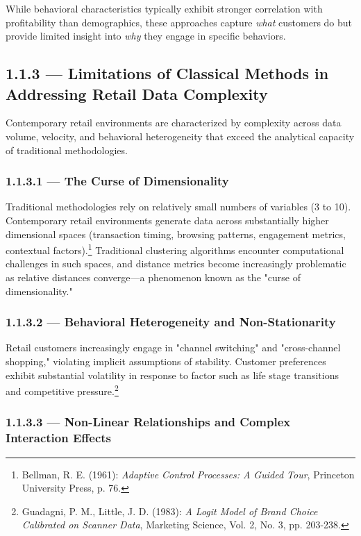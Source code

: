 \documentclass[12pt,a4paper,oneside]{report}
\begin{document}
While behavioral characteristics typically exhibit stronger correlation with profitability than demographics, these approaches capture \textit{what} customers do but provide limited insight into \textit{why} they engage in specific behaviors.

\subsection{1.1.3 — Limitations of Classical Methods in Addressing Retail Data Complexity}

Contemporary retail environments are characterized by complexity across data volume, velocity, and behavioral heterogeneity that exceed the analytical capacity of traditional methodologies.

\subsubsection{1.1.3.1 — The Curse of Dimensionality}

Traditional methodologies rely on relatively small numbers of variables (3 to 10). Contemporary retail environments generate data across substantially higher dimensional spaces (transaction timing, browsing patterns, engagement metrics, contextual factors).\footnote{Bellman, R. E. (1961): \textit{Adaptive Control Processes: A Guided Tour}, Princeton University Press, p. 76.} Traditional clustering algorithms encounter computational challenges in such spaces, and distance metrics become increasingly problematic as relative distances converge—a phenomenon known as the "curse of dimensionality."

\subsubsection{1.1.3.2 — Behavioral Heterogeneity and Non-Stationarity}

Retail customers increasingly engage in "channel switching" and "cross-channel shopping," violating implicit assumptions of stability. Customer preferences exhibit substantial volatility in response to factor such as life stage transitions and competitive pressure.\footnote{Guadagni, P. M., Little, J. D. (1983): \textit{A Logit Model of Brand Choice Calibrated on Scanner Data}, Marketing Science, Vol. 2, No. 3, pp. 203-238.}

\subsubsection{1.1.3.3 — Non-Linear Relationships and Complex Interaction Effects}
\end{document}
